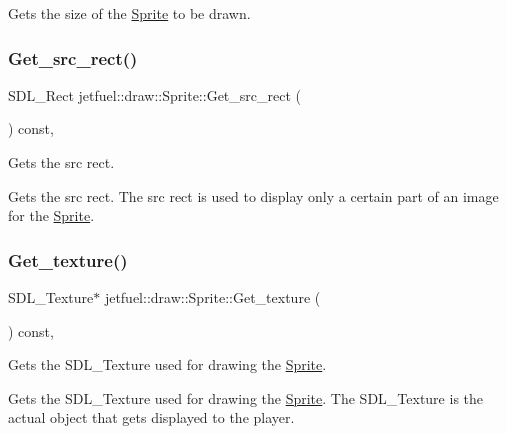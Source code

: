 Gets the size of the \hyperlink{classjetfuel_1_1draw_1_1Sprite}{Sprite} to be drawn. \mbox{\label{classjetfuel_1_1draw_1_1Sprite_ab3e7bda170f41633ec80408b639286db}} 
\subsubsection{\texorpdfstring{Get\+\_\+src\+\_\+rect()}{Get\_src\_rect()}}
{\footnotesize\ttfamily S\+D\+L\+\_\+\+Rect jetfuel\+::draw\+::\+Sprite\+::\+Get\+\_\+src\+\_\+rect (\begin{DoxyParamCaption}{ }\end{DoxyParamCaption}) const\hspace{0.3cm}{\ttfamily [inline]}, {\ttfamily [protected]}}



Gets the src rect. 

Gets the src rect. The src rect is used to display only a certain part of an image for the \hyperlink{classjetfuel_1_1draw_1_1Sprite}{Sprite}. \mbox{\label{classjetfuel_1_1draw_1_1Sprite_ad2d60845bf4e9915b162b07e0d96bf76}} 
\subsubsection{\texorpdfstring{Get\+\_\+texture()}{Get\_texture()}}
{\footnotesize\ttfamily S\+D\+L\+\_\+\+Texture$\ast$ jetfuel\+::draw\+::\+Sprite\+::\+Get\+\_\+texture (\begin{DoxyParamCaption}{ }\end{DoxyParamCaption}) const\hspace{0.3cm}{\ttfamily [inline]}, {\ttfamily [protected]}}



Gets the S\+D\+L\+\_\+\+Texture used for drawing the \hyperlink{classjetfuel_1_1draw_1_1Sprite}{Sprite}. 

Gets the S\+D\+L\+\_\+\+Texture used for drawing the \hyperlink{classjetfuel_1_1draw_1_1Sprite}{Sprite}. The S\+D\+L\+\_\+\+Texture is the actual object that gets displayed to the player. \mbox{\label{classjetfuel_1_1draw_1_1Sprite_a06c4dbfd70dc6d52c2cea3d3f624fe83}} 
